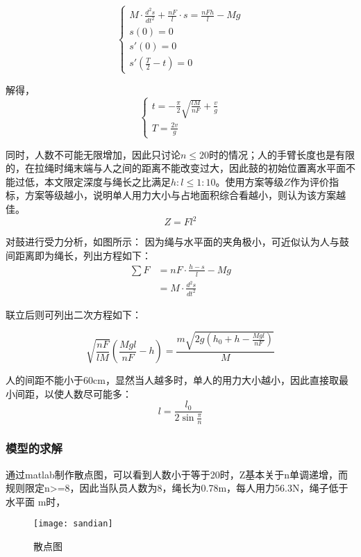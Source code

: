 \documentclass[withoutpreface,bwprint]{cumcmthesis} %
\begin{document}
\begin{equation}
\begin{cases}
     M\cdot\frac{d^{2}s}{dt^{2}}+\frac{nF}{l}\cdot s = \frac{nFh}{l}-Mg \\
	    s\left ( 0\right )=0 \\
       s'\left ( 0 \right )=0 \\
s'(\frac{T}{2}-t)=0
\end{cases}
\end{equation}
\par
解得，
\begin{equation}
\begin{cases}
    t=-\frac{\pi}{2}\sqrt{\frac{lM}{nF}}+\frac{v}{g}\\
	T=\frac{2v}{g}
\end{cases}
\end{equation}


\par
同时，人数不可能无限增加，因此只讨论$n\leq 20$时的情况；人的手臂长度也是有限的，在拉绳时绳末端与人之间的距离不能改变过大，因此鼓的初始位置离水平面不能过低，本文限定深度与绳长之比满足$h:l\leq 1:10$。使用方案等级$Z$作为评价指标，方案等级越小，说明单人用力大小与占地面积综合看越小，则认为该方案越佳。
\begin{equation}
Z=Fl^2
\end{equation}

\par
对鼓进行受力分析，如图所示：
因为绳与水平面的夹角极小，可近似认为人与鼓间距离即为绳长，列出方程如下：
\begin{align}
\sum F  &= n F\cdot \frac{h-s}{l}-M g \\
 &=M\cdot \frac{d^{2}s}{dt^{2}}
\label{1}
\end{align}


联立后则可列出二次方程如下：

\begin{equation}
\sqrt{\frac{nF}{lM}}\left ( \frac{Mgl}{nF}-h \right )=\frac{m\sqrt{2g\left ( h_0+h-\frac{Mgl}{nF} \right )}}{M}
\end{equation}

人的间距不能小于60cm，显然当人越多时，单人的用力大小越小，因此直接取最小间距，以使人数尽可能多：
\begin{equation}
l=\frac{l_0}{2\sin\frac{\pi}{n}}
\end{equation}
	\subsubsection{模型的求解}
通过matlab制作散点图，可以看到人数小于等于20时，Z基本关于n单调递增，而规则限定n>=8，因此当队员人数为8，绳长为0.78m，每人用力56.3N，绳子低于水平面 m时，
\begin{figure}[!h]
    \centering
    \texttt{[image: sandian]}
    \caption{散点图}
    \label{fig:sandian}
\end{figure}
\end{document}
